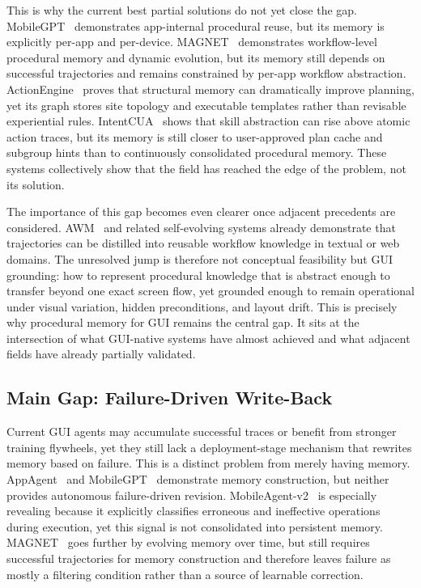 \documentclass{article}
\begin{document}
This is why the current best partial solutions do not yet close the gap.
MobileGPT~\parencite{lee2024exploreselectderiverecall} demonstrates app-internal
procedural reuse, but its memory is explicitly per-app and per-device.
MAGNET~\parencite{sun2026magnetadaptiveguiagents} demonstrates workflow-level procedural
memory and dynamic evolution, but its memory still depends on
successful trajectories and remains constrained by per-app workflow
abstraction. ActionEngine~\parencite{zhong2026actionenginereactiveprogrammaticgui} proves that
structural memory can dramatically improve planning, yet its graph
stores site topology and executable templates rather than revisable
experiential rules. IntentCUA~\parencite{lee2026intentcualearningintentlevelrepresentations} shows that
skill abstraction can rise above atomic action traces, but its memory
is still closer to user-approved plan cache and subgroup hints than to
continuously consolidated procedural memory. These systems collectively
show that the field has reached the edge of the problem, not its
solution.

The importance of this gap becomes even clearer once adjacent precedents
are considered. AWM~\parencite{wang2024agentworkflowmemory} and related self-evolving
systems already demonstrate that trajectories can be distilled into
reusable workflow knowledge in textual or web domains. The unresolved
jump is therefore not conceptual feasibility but GUI grounding: how to
represent procedural knowledge that is abstract enough to transfer
beyond one exact screen flow, yet grounded enough to remain operational
under visual variation, hidden preconditions, and layout drift. This is
precisely why procedural memory for GUI remains the central gap. It sits
at the intersection of what GUI-native systems have almost achieved and
what adjacent fields have already partially validated.

\subsection{Main Gap: Failure-Driven Write-Back}\label{62-main-gap-failure-driven-write-back}

Current GUI agents may accumulate successful traces or benefit from
stronger training flywheels, yet they still lack a deployment-stage
mechanism that rewrites memory based on failure. This is a distinct
problem from merely having memory. AppAgent~\parencite{zhang2023appagentmultimodalagentssmartphone}
and MobileGPT~\parencite{lee2024exploreselectderiverecall} demonstrate memory
construction,
but neither provides autonomous failure-driven revision.
MobileAgent-v2~\parencite{wang2024mobileagentv2mobiledeviceoperation} is especially
revealing because it explicitly classifies erroneous and ineffective
operations during execution, yet this signal is not consolidated into
persistent memory. MAGNET~\parencite{sun2026magnetadaptiveguiagents} goes further by
evolving memory over time, but still requires successful trajectories
for memory construction and therefore leaves failure as mostly a
filtering condition rather than a source of learnable correction.
\end{document}
